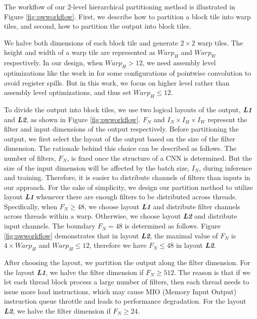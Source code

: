 The workflow of our 2-level hierarchical partitioning method is illustrated in Figure \ref{fig:pwworkflow}. First, we describe how to
partition a block tile into warp tiles, and second, how to partition the output into block tiles.

We halve both dimensions of each block tile and generate $2 \times 2$ warp tiles. The height and width of a warp tile are represented as
$Warp_H$ and $Warp_W$ respectively. In our design, when $Warp_H > 12$, we need assembly level optimizations like the work in
\cite{yan2020optimizing,yan2020demystifying} for some configurations of pointwise convolution to avoid register spills. But in this work,
we focus on higher level rather than assembly level optimizations, and thus set $Warp_H \leq 12$.

To divide the output into block tiles, we use two logical layouts of the output, \textbf{\emph{L1}} and \textbf{\emph{L2}}, as shown in Figure \ref{fig:pwworkflow}.
$F_N$ and $I_N \times I_H \times I_W$ represent the filter and input dimensions of the output respectively.
Before partitioning the output, we first select the layout of the output based on the size of the filter dimension.
The rationale behind this choice can be described as follows.
The number of filters, $F_N$, is fixed once the structure of a CNN is determined.
But the size of the input dimension will be affected by the batch size, $I_N$, during inference and training.
Therefore, it is easier to distribute channels of filters than inputs in our approach.
For the sake of simplicity, we design our partition method to utilize layout \textbf{\emph{L1}} whenever there are enough filters to be distributed across threads.
Specifically, when $F_N \ge 48$, we choose layout \textbf{\emph{L1}} and distribute filter channels across threads within a warp.
Otherwise, we choose layout \textbf{\emph{L2}} and distribute input channels.
The boundary $F_N = 48$ is determined as follows.
Figure \ref{fig:pwworkflow} demonstrates that in layout \textbf{\emph{L2}}, the maximal value of $F_N$ is $4 \times Warp_H$ and $Warp_H \leq 12$, therefore we have $F_N \leq 48$ in layout \textbf{\emph{L2}}.

After choosing the layout, we partition the output along the filter dimension.
For the layout \textbf{\emph{L1}}, we halve the filter dimension if $F_N \geq 512$.
The reason is that if we let each thread block process a large number of filters, then each thread needs to issue more load instructions, which may cause MIO (Memory Input Output) instruction queue throttle and leads to performance degradation.
For the layout \textbf{\emph{L2}}, we halve the filter dimension if $F_N \geq 24$.

